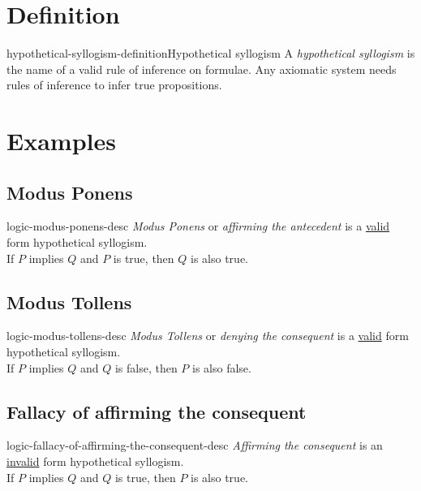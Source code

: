 \documentclass[preview]{standalone}
\begin{document}
\genpage

\section{Definition}

\begin{snippetdefinition}{hypothetical-syllogism-definition}{Hypothetical syllogism}
    A \textit{hypothetical syllogism} is the name of a valid rule of inference on formulae.
    Any axiomatic system needs rules of inference to infer true propositions.
\end{snippetdefinition}


\section{Examples}

\subsection{Modus Ponens}

\begin{snippet}{logic-modus-ponens-desc}
    \textit{Modus Ponens} or \textit{affirming the antecedent}
    is a \underline{valid} form hypothetical syllogism. \\
    If \(P\) implies \(Q\) and \(P\) is true, then \(Q\) is also true.
\end{snippet}


\subsection{Modus Tollens}

\begin{snippet}{logic-modus-tollens-desc}
    \textit{Modus Tollens} or \textit{denying the consequent}
    is a \underline{valid} form hypothetical syllogism. \\
    If \(P\) implies \(Q\) and \(Q\) is false, then \(P\) is also false.
\end{snippet}


\subsection{Fallacy of affirming the consequent}

\begin{snippet}{logic-fallacy-of-affirming-the-consequent-desc}
    \textit{Affirming the consequent}
    is an \underline{invalid} form hypothetical syllogism. \\
    If \(P\) implies \(Q\) and \(Q\) is true, then \(P\) is also true.
\end{snippet}
\end{document}
